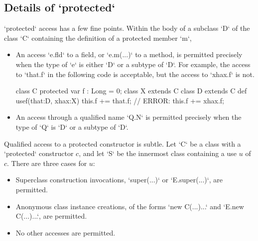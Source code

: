 \subsection{Details of \xcd`protected`}
\label{sect:protected-details}

\xcd`protected` access has a few fine points. 
Within the body of a subclass \xcd`D` of the class \xcd`C` containing
the definition of a protected member \xcd`m`, 

\begin{itemize}

\item An access \xcd`e.fld` to a field, or \xcd`e.m(...)` to a method, is
      permitted precisely when the type of \xcd`e` is either \xcd`D` or a
      subtype of \xcd`D`.  
For example, the access to \xcd`that.f` in the following code is acceptable, but
the access to \xcd`xhax.f` is not.  
\begin{xten}
class C {
  protected var f : Long = 0;
}
class X extends C {}
class D extends C {
  def usef(that:D, xhax:X) {
     this.f += that.f; 
     // ERROR: this.f += xhax.f;
  }
}
\end{xten}
%


\item An access through a qualified name \xcd`Q.N` is permitted precisely when
      the type of \xcd`Q` is \xcd`D` or a subtype of \xcd`D`. 

\end{itemize}

Qualified access to a protected constructor is subtle.  Let \xcd`C` be a class
with a \xcd`protected` constructor $c$, and let \xcd`S` be the innermost
class containing a use $u$ of $c$.  There are three cases for $u$: 

\begin{itemize}
\item Superclass construction invocations, \xcd`super(...)` or
      \xcd`E.super(...)`, are permitted.
\item Anonymous class instance creations, of the forms  \xcd`new C(...){...}`
      and \xcd`E.new C(...){...}`, are
      permitted.
\item No other accesses are permitted. 
\end{itemize}

